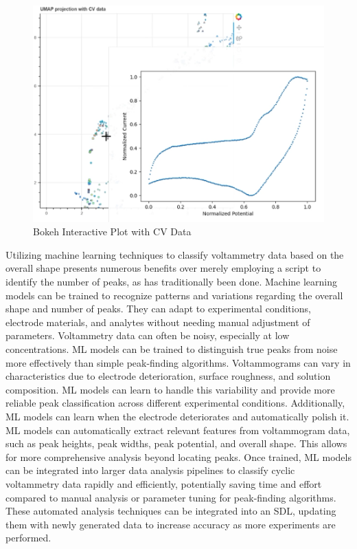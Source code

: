 \begin{figure}[!h]
  \centering
    \includegraphics[width=1.0\textwidth]{figures/bokeh.png}
    \caption{Bokeh Interactive Plot with CV Data}
    \label{bokeh}
\end{figure}
Utilizing machine learning techniques to classify voltammetry data based on the overall shape presents numerous benefits over merely employing a script to identify the number of peaks, as has traditionally been done. Machine learning models can be trained to recognize patterns and variations regarding the overall shape and number of peaks. They can adapt to experimental conditions, electrode materials, and analytes without needing manual adjustment of parameters. Voltammetry data can often be noisy, especially at low concentrations. ML models can be trained to distinguish true peaks from noise more effectively than simple peak-finding algorithms. Voltammograms can vary in characteristics due to electrode deterioration, surface roughness, and solution composition. ML models can learn to handle this variability and provide more reliable peak classification across different experimental conditions. Additionally, ML models can learn when the electrode deteriorates and automatically polish it. ML models can automatically extract relevant features from voltammogram data, such as peak heights, peak widths, peak potential, and overall shape. This allows for more comprehensive analysis beyond locating peaks. Once trained, ML models can be integrated into larger data analysis pipelines to classify cyclic voltammetry data rapidly and efficiently, potentially saving time and effort compared to manual analysis or parameter tuning for peak-finding algorithms. These automated analysis techniques can be integrated into an SDL, updating them with newly generated data to increase accuracy as more experiments are performed.

